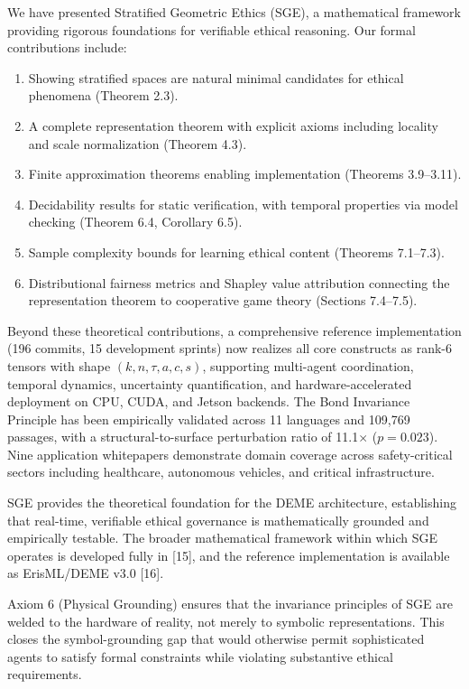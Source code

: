 \documentclass[12pt]{article}
\theoremstyle{plain}
\theoremstyle{definition}
\theoremstyle{remark}
\begin{document}
We have presented Stratified Geometric Ethics (SGE), a mathematical
framework providing rigorous foundations for verifiable ethical
reasoning. Our formal contributions include:

\begin{enumerate}
\item
  Showing stratified spaces are natural minimal candidates for ethical
  phenomena (Theorem 2.3).
\item
  A complete representation theorem with explicit axioms including
  locality and scale normalization (Theorem 4.3).
\item
  Finite approximation theorems enabling implementation (Theorems
  3.9--3.11).
\item
  Decidability results for static verification, with temporal properties
  via model checking (Theorem 6.4, Corollary 6.5).
\item
  Sample complexity bounds for learning ethical content (Theorems
  7.1--7.3).
\item
  Distributional fairness metrics and Shapley value attribution connecting
  the representation theorem to cooperative game theory (Sections 7.4--7.5).
\end{enumerate}

Beyond these theoretical contributions, a comprehensive reference
implementation (196 commits, 15 development sprints) now realizes all
core constructs as rank-6 tensors with shape $(k, n, \tau, a, c, s)$,
supporting multi-agent coordination, temporal dynamics, uncertainty
quantification, and hardware-accelerated deployment on CPU, CUDA, and
Jetson backends. The Bond Invariance Principle has been empirically
validated across 11 languages and 109,769 passages, with a
structural-to-surface perturbation ratio of 11.1$\times$ ($p = 0.023$).
Nine application whitepapers demonstrate domain coverage across
safety-critical sectors including healthcare, autonomous vehicles, and
critical infrastructure.

SGE provides the theoretical foundation for the DEME architecture,
establishing that real-time, verifiable ethical governance is
mathematically grounded and empirically testable. The broader mathematical framework within which SGE operates is developed fully in {[}15{]}, and the reference implementation is available as ErisML/DEME v3.0 {[}16{]}.

Axiom 6 (Physical Grounding) ensures that the invariance principles of
SGE are welded to the hardware of reality, not merely to symbolic
representations. This closes the symbol-grounding gap that would
otherwise permit sophisticated agents to satisfy formal constraints
while violating substantive ethical requirements.
\end{document}
